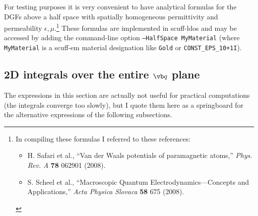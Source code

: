 \documentclass[letterpaper]{article}
\begin{document}
For testing purposes it is very convenient to have
analytical formulas for the DGFs above a half space
with spatially homogeneous permittivity and permeability 
$\epsilon,\mu$.\footnote{In compiling these formulas I 
referred to these references:
\begin{itemize}
 \item H. Safari et al., ``Van der Waals potentials of 
       paramagnetic atoms,'' 
       \textit{Phys. Rev. A} \textbf{78} 062901 (2008).
 \item S. Scheel et al., 
       ``Macroscopic Quantum Electrodynamics---Concepts and 
       Applications,'' \textit{Acta Physica Slovaca} \textbf{58}
       675 (2008).
 \end{itemize}} 
These formulas are implemented in {\sc scuff-ldos} and
may be accessed by adding the command-line option
\texttt{--HalfSpace MyMaterial}
(where \texttt{MyMaterial} is a {\sc scuff-em} material
designation like \texttt{Gold} or \texttt{CONST\_EPS\_10+1I}).

\subsection{2D integrals over the entire $\vb q$ plane}

The expressions in this section are actually not useful
for practical computations (the integrals converge too 
slowly), but I quote them here as a springboard for the 
alternative expressions of the following subsections.
\end{document}

